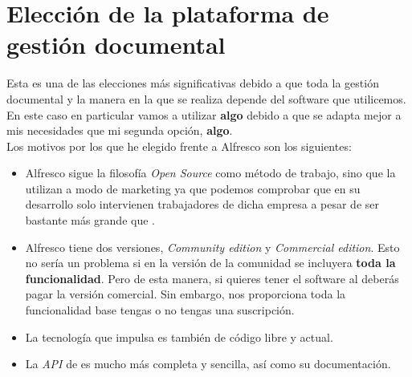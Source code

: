 \chapter{Elección de la plataforma de gestión documental}

Esta es una de las elecciones más significativas debido a que toda la gestión documental
y la manera en la que se realiza depende del software que utilicemos.
\\

En este caso en particular vamos a utilizar \textbf{algo} debido a que se adapta mejor a mis
necesidades que mi segunda opción, \textbf{algo}.
\\

Los motivos por los que he elegido  frente a Alfresco son los siguientes:

\begin{itemize}
	\item Alfresco sigue la filosofía \textit{Open Source} como método de trabajo, sino que la utilizan a modo de marketing
	 			ya que podemos comprobar que en su desarrollo solo intervienen trabajadores de dicha empresa a pesar de ser bastante
				más grande que .
	\item Alfresco tiene dos versiones, \textit{Community edition} y \textit{Commercial edition}. Esto no sería un problema
				si en la versión de la comunidad se incluyera \textbf{toda la funcionalidad}. Pero de esta manera, si quieres tener
				el software al  deberás pagar la versión comercial. Sin embargo,  nos proporciona toda la funcionalidad
				base tengas o no tengas  una suscripción.
	\item La tecnología que impulsa  es también de código libre y actual.
	\item La \textit{API} de  es mucho más completa y sencilla, así como su documentación.
\end{itemize}
